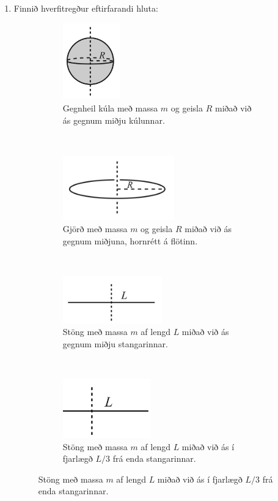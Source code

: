 \begin{enumerate}[label = \textbf{Dæmi \thechapter.\arabic*.}]
\item Finnið hverfitregður eftirfarandi hluta:

\vspace{0.3cm}

\begin{figure}[h]
    \centering
    \begin{subfigure}[t]{0.4\textwidth}
        \centering
        \includegraphics[height=1.3in]{images/gkula.png}
        \caption{Gegnheil kúla með massa $m$ og geisla $R$ miðað við ás gegnum miðju kúlunnar.}
    \end{subfigure}
    ~ 
    \begin{subfigure}[t]{0.4\textwidth}
        \centering
        \includegraphics[height=1.1in]{images/gjord.png}
        \caption{Gjörð með massa $m$ og geisla $R$ miðað við ás gegnum miðjuna, hornrétt á flötinn.}
    \end{subfigure}
    ~ 
    \begin{subfigure}[t]{0.4\textwidth}
        \centering
        \includegraphics[height=0.8in]{images/stong.png}
        \caption{Stöng með massa $m$ af lengd $L$ miðað við ás gegnum miðju stangarinnar.}
    \end{subfigure}
    ~ 
    \begin{subfigure}[t]{0.4\textwidth}
        \centering
        \includegraphics[height=1in]{images/steinerston.png}
        \caption{Stöng með massa $m$ af lengd $L$ miðað við ás í fjarlægð $L/3$ frá enda stangarinnar.}
    \end{subfigure}
\end{figure}


\end{enumerate}
